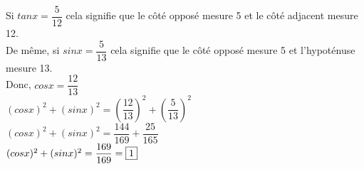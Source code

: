\documentclass[a4paper,11pt]{article}
\begin{document}
\red

Si $tan x =  \dfrac{5}{12}$ cela signifie que le côté opposé mesure 5 et le côté adjacent mesure 12.\\
De même, si $sin x =  \dfrac{5}{13} $ cela signifie que le côté opposé mesure 5 et l'hypoténuse mesure 13.\\

Donc, $cos x = \dfrac{12}{13}$\\

$(cos x)^{2} + (sin x)^{2} = (\dfrac{12}{13})^{2} + (\dfrac{5}{13})^{2} $\\

$(cos x)^{2} + (sin x)^{2} = \dfrac{144}{169} + \dfrac{25}{165} $\\

$(cos x)^{2} + (sin x)^{2} = \dfrac{169}{169} = \fbox{1} $\\
\end{document}
